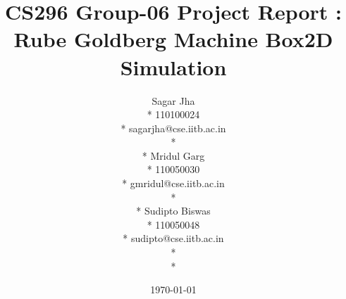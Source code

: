\documentclass[11pt]{article}
\begin{document}
\title{CS296 Group-06 Project Report : Rube Goldberg Machine Box2D Simulation}
\author{ 
Sagar Jha\\*
110100024\\*
sagarjha@cse.iitb.ac.in\\*\\*
Mridul Garg\\*
110050030\\*
gmridul@cse.iitb.ac.in\\*\\*
Sudipto Biswas \\*
110050048\\*
sudipto@cse.iitb.ac.in\\*\\*
}
\date{\today}
\maketitle
\end{document}
